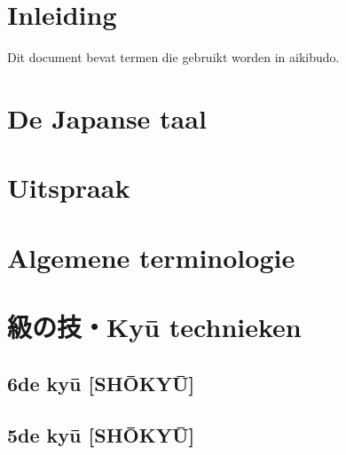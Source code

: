 \documentclass[a4paper, 12pt]{article}
\begin{document}




\newpage


\newpage
\setcounter{page}{1}
\tableofcontents

\newpage
\setcounter{page}{1}

\section{Inleiding}
\noindent Dit document bevat termen die gebruikt worden in aikibudo.

\section{De Japanse taal}


\section{Uitspraak}


\section{Algemene terminologie}


\newpage
\section{級の技・Ky\={u} technieken}
\subsection{6de ky\={u} [SH\={O}KY\={U}]}


\newpage
\subsection{5de ky\={u} [SH\={O}KY\={U}]}

\end{document}
